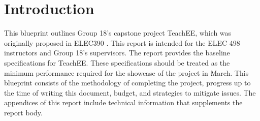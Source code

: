 \documentclass[letterpaper,12pt]{article}
\begin{document}
\tableofcontents
\listoffigures
\listoftables
\newpage
{}
\section{Introduction} \label{sec:intro} %
This blueprint outlines Group 18's capstone project TeachEE, which was
originally proposed in ELEC390 \cite{prop_390}. This report is intended for the
ELEC 498 instructors and Group 18's supervisors. The report provides the
baseline specifications for TeachEE. These specifications should be treated as
the minimum performance required for the showcase of the project in March. This
blueprint consists of the methodology of completing the project, progress up to
the time of writing this document, budget, and strategies to mitigate issues.
The appendices of this report include technical information that supplements the
report body.

\end{document}
